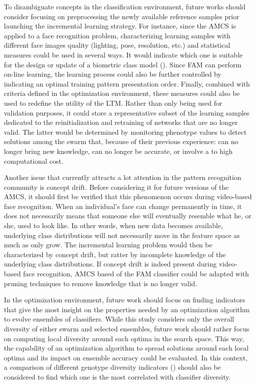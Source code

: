 To disambiguate concepts in the classification environment, future works should consider focusing on preprocessing the newly available reference samples prior launching the incremental learning strategy.
For instance, since the AMCS is applied to a face recognition problem, characterizing learning samples with different face images quality (lighting, pose, resolution, etc.) and statistical measures could be used in several ways.
It would indicate which one is suitable for the design or update of a biometric class model (\cite{koh02}).
Since FAM can perform on-line learning, the learning process could also be further controlled by indicating an optimal training pattern presentation order.
Finally, combined with criteria defined in the optimization environment, these measures could also be used to redefine the utility of the LTM.
Rather than only being used for validation purposes, it could store a representative subset of the learning samples dedicated to the reinitialization and retraining of networks that are no longer valid.
The latter would be determined by monitoring phenotype values to detect solutions among the swarm that, because of their previous experience: can no longer bring new knowledge, can no longer be accurate, or involve a to high computational cost.

Another issue that currently attracts a lot attention in the pattern recognition community is concept drift.
Before considering it for future versions of the AMCS, it should first be verified that this phenomenon occurs during video-based face recognition.
When an individual's face can change permanently in time, it does not necessarily means that someone else will eventually resemble what he, or she, used to look like.
In other words, when new data becomes available, underlying class distributions will not necessarily move in the feature space as much as only grow.
The incremental learning problem would then be characterized by concept drift, but ratter by incomplete knowledge of the underlying class distributions.
If concept drift is indeed present during video-based face recognition, AMCS based of the FAM classifier could be adapted with pruning techniques to remove knowledge that is no longer valid.

In the optimization environment, future work should focus on finding indicators that give the most insight on the properties needed by an optimization algorithm to evolve ensembles of classifiers.  
While this study considers only the overall diversity of either swarm and selected ensembles, future work should rather focus on computing local diversity around each optima in the search space.
This way, the capability of an optimization algorithm to spread solutions around each local optima and its impact on ensemble accuracy could be evaluated.
In this context, a comparison of different genotype diversity indicators (\cite{corriveau12, orlunda08}) should also be considered to find which one is the most correlated with classifier diversity.

